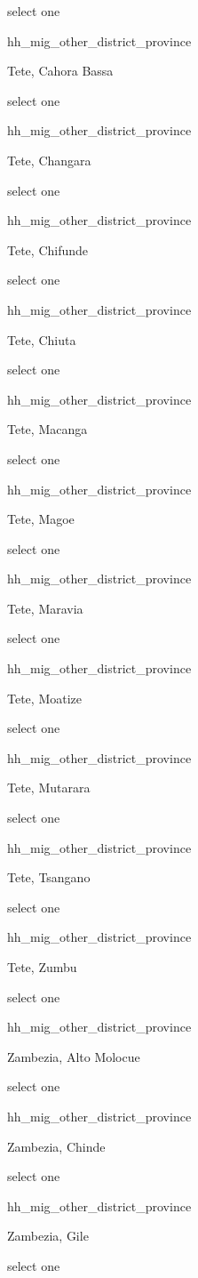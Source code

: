 \documentclass[]{article}
\begin{document}
select one

hh\_mig\_other\_district\_province

Tete, Cahora Bassa

select one

hh\_mig\_other\_district\_province

Tete, Changara

select one

hh\_mig\_other\_district\_province

Tete, Chifunde

select one

hh\_mig\_other\_district\_province

Tete, Chiuta

select one

hh\_mig\_other\_district\_province

Tete, Macanga

select one

hh\_mig\_other\_district\_province

Tete, Magoe

select one

hh\_mig\_other\_district\_province

Tete, Maravia

select one

hh\_mig\_other\_district\_province

Tete, Moatize

select one

hh\_mig\_other\_district\_province

Tete, Mutarara

select one

hh\_mig\_other\_district\_province

Tete, Tsangano

select one

hh\_mig\_other\_district\_province

Tete, Zumbu

select one

hh\_mig\_other\_district\_province

Zambezia, Alto Molocue

select one

hh\_mig\_other\_district\_province

Zambezia, Chinde

select one

hh\_mig\_other\_district\_province

Zambezia, Gile

select one
\end{document}
